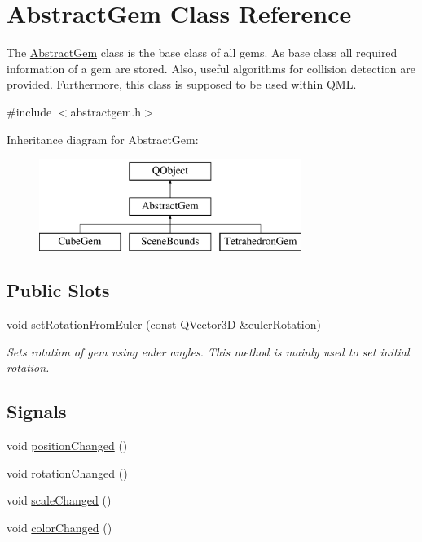 \hypertarget{class_abstract_gem}{\section{Abstract\+Gem Class Reference}
\label{class_abstract_gem}
}


The \hyperlink{class_abstract_gem}{Abstract\+Gem} class is the base class of all gems.  As base class all required information of a gem are stored. Also, useful algorithms for collision detection are provided. Furthermore, this class is supposed to be used within Q\+M\+L.  




{\ttfamily \#include $<$abstractgem.\+h$>$}

Inheritance diagram for Abstract\+Gem\+:\begin{figure}[H]
\begin{center}
\leavevmode
\includegraphics[height=3.000000cm]{class_abstract_gem}
\end{center}
\end{figure}
\subsection*{Public Slots}
\begin{DoxyCompactItemize}
\item 
void \hyperlink{class_abstract_gem_a6198aae1f2f54d73a7a5e66ca60f5f67}{set\+Rotation\+From\+Euler} (const Q\+Vector3\+D \&euler\+Rotation)
\begin{DoxyCompactList}\small\item\em Sets rotation of gem using euler angles. This method is mainly used to set initial rotation. \end{DoxyCompactList}\end{DoxyCompactItemize}
\subsection*{Signals}
\begin{DoxyCompactItemize}
\item 
void \hyperlink{class_abstract_gem_ac84dd4c9b3ea3adf02c1bfa74a29b649}{position\+Changed} ()
\item 
void \hyperlink{class_abstract_gem_a2702e870321deb40a8f056c1fce01094}{rotation\+Changed} ()
\item 
void \hyperlink{class_abstract_gem_a7e6bfe659f09bc68222211a58c365177}{scale\+Changed} ()
\item 
void \hyperlink{class_abstract_gem_ae20ad53d4ddeff9fc13878e7db5a3253}{color\+Changed} ()
\end{DoxyCompactItemize}
